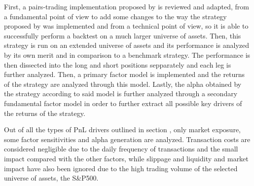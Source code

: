 First, a pairs-trading implementation proposed by \cite{gallego_2023} is reviewed and adapted, from a fundamental point of view to add some changes to the way the strategy proposed by \cite{ioannis_2023} was implemented and from a technical point of view, so it is able to successfully perform a backtest on a much larger universe of assets. Then, this strategy is run on an extended universe of assets and its performance is analyzed by its own merit and in comparison to a benchmark strategy. The performance is then dissected into the long and short positions sepparately and each leg is further analyzed. 
Then, a primary factor model is implemented and the returns of the strategy are analyzed through this model.  
Lastly, the alpha obtained by the strategy according to said model is further analyzed through a secondary fundamental factor model in order to further extract all possible key drivers of the returns of the strategy. 

Out of all the types of PnL drivers outlined in section , only market exposure, some factor sensitivities and alpha generation are analyzed. Transaction costs are considered negligible due to the daily frequency of transactions and the small impact compared with the other factors, while slippage and liquidity and market impact have also been ignored due to the high trading volume of the selected universe of assets, the S\&P500. 
